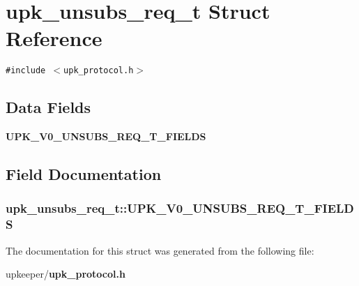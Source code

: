 \section{upk\_\-unsubs\_\-req\_\-t Struct Reference}
\label{structupk__unsubs__req__t}
{\tt \#include $<$upk\_\-protocol.h$>$}

\subsection*{Data Fields}
\begin{CompactItemize}
\item 
\bf{UPK\_\-V0\_\-UNSUBS\_\-REQ\_\-T\_\-FIELDS}
\end{CompactItemize}


\subsection{Field Documentation}
\subsubsection{\setlength{\rightskip}{0pt plus 5cm}\bf{upk\_\-unsubs\_\-req\_\-t::UPK\_\-V0\_\-UNSUBS\_\-REQ\_\-T\_\-FIELDS}}\label{structupk__unsubs__req__t_3ac51b6a84f54c8c271bdc4d48cd64cd}




The documentation for this struct was generated from the following file:\begin{CompactItemize}
\item 
upkeeper/\bf{upk\_\-protocol.h}\end{CompactItemize}
